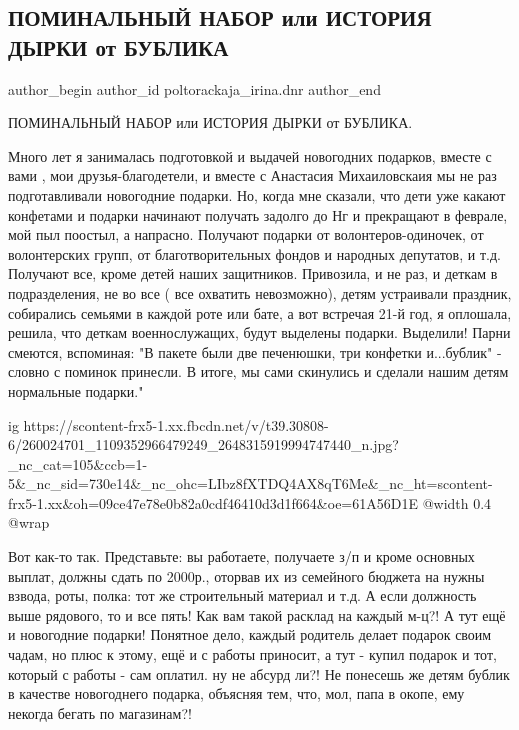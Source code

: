  
 
 
 
 
 
\subsection{ПОМИНАЛЬНЫЙ НАБОР или ИСТОРИЯ ДЫРКИ от БУБЛИКА}
\label{sec:26_11_2021.fb.poltorackaja_irina.dnr.1.dyrka_ot_bublika}
 
\ifcmt
 author_begin
   author_id poltorackaja_irina.dnr
 author_end
\fi

ПОМИНАЛЬНЫЙ НАБОР или ИСТОРИЯ ДЫРКИ от БУБЛИКА.

Много лет я занималась подготовкой и выдачей новогодних подарков, вместе с вами
, мои друзья-благодетели, и вместе с Анастасия Михаиловскаия мы не раз
подготавливали новогодние подарки. Но, когда мне сказали, что дети уже какают
конфетами и подарки начинают получать задолго до Нг и прекращают в феврале, мой
пыл поостыл, а напрасно. Получают подарки от волонтеров-одиночек, от
волонтерских групп, от благотворительных фондов и народных депутатов, и т.д.
Получают все, кроме детей наших защитников. Привозила, и не раз, и деткам в
подразделения, не во все ( все охватить невозможно), детям устраивали праздник,
собирались семьями в каждой роте или бате, а вот встречая 21-й год, я оплошала,
решила, что деткам военнослужащих, будут выделены подарки. Выделили! Парни
смеются, вспоминая: "В пакете были две печенюшки, три конфетки и...бублик" -
словно с поминок принесли. В итоге, мы сами скинулись и сделали нашим детям
нормальные подарки."

\ifcmt
  ig https://scontent-frx5-1.xx.fbcdn.net/v/t39.30808-6/260024701_1109352966479249_2648315919994747440_n.jpg?_nc_cat=105&ccb=1-5&_nc_sid=730e14&_nc_ohc=LIbz8fXTDQ4AX8qT6Me&_nc_ht=scontent-frx5-1.xx&oh=09ce47e78e0b82a0cdf46410d3d1f664&oe=61A56D1E
  @width 0.4
  @wrap 
\fi

Вот как-то так. Представьте: вы работаете, получаете з/п и кроме основных
выплат, должны сдать по 2000р., оторвав их из семейного бюджета на нужны
взвода, роты, полка: тот же строительный материал и т.д. А если должность
выше рядового, то и все пять! Как вам такой расклад на каждый м-ц?! А тут ещё
и новогодние подарки! Понятное дело, каждый родитель делает подарок своим
чадам, но плюс к этому, ещё и с работы приносит, а тут - купил подарок и тот,
который с работы - сам оплатил. ну не абсурд ли?! Не понесешь же детям бублик
в качестве новогоднего подарка, объясняя тем, что, мол, папа в окопе, ему
некогда бегать по магазинам?! 

